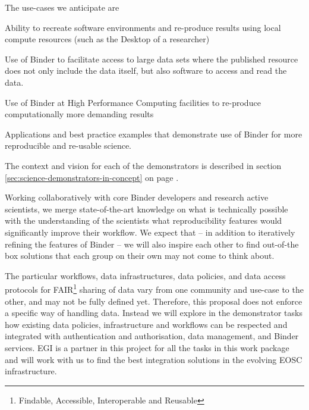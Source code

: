 \begin{workpackage}[
  id=applications,
  wphases=0-36,
  swsites,
  title=Applications and use cases,
  short=Applications,
  lead=MP,
  MPRM=9,
  SRLRM=9,
  UIORM=8,
  IFRRM=8
]
\begin{wpdescription}
  The use-cases we anticipate are
  \begin{compactitem}
  \item {} Ability to recreate software environments
    and re-produce results using local compute resources (such as the Desktop of
    a researcher)
  \item {} Use of Binder to facilitate access to
    large data sets where the published resource does not only include the data
    itself, but also software to access and read the data.
  \item {} Use of Binder at High Performance Computing
    facilities to re-produce computationally more demanding results
    \item {} Applications and best practice examples that
    demonstrate use of Binder for more reproducible and re-usable science.
  \end{compactitem}
    
  The context and vision for each of the demonstrators is described in
  section \ref{sec:science-demonstrators-in-concept} on page
  \pageref{sec:science-demonstrators-in-concept}.

  Working collaboratively with core Binder developers and research active
  scientists, we merge state-of-the-art knowledge on what is technically
  possible with the understanding of the scientists what reproducibility
  features would significantly improve their workflow. We expect that -- in
  addition to iteratively refining the features of Binder -- we will also
  inspire each other to find out-of-the box solutions that each group on
  their own may not come to think about.

  \medskip

  The particular workflows, data infrastructures, data policies, and data access
  protocols for
  FAIR\footnote{Findable, Accessible, Interoperable and Reusable} sharing of data vary from one community and use-case to
  the other, and may not be fully defined yet. Therefore, this proposal
  does not enforce a specific way of handling data. Instead we
  will explore in the demonstrator tasks how existing data policies,
  infrastructure and workflows can be respected and integrated with
  authentication and authorisation, data management, and
  Binder services. EGI is a partner in this project 
  for all the tasks in this work package and will work with us to find the
  best integration solutions in the evolving EOSC infrastructure.


\end{wpdescription}
\end{workpackage}
